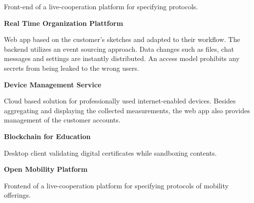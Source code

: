 \documentclass[12pt,a4paper,ragged2e,withhyper]{altacv} %
\begin{document}
\begin{paracol}{2}
\medskip
{}  

\divider

\vspace{-4pt}
Front-end of a live-cooperation platform for specifying protocols.

\medskip
{}

\medskip
{}     

\switchcolumn



\textbf{Real Time Organization Plattform}

Web app based on the customer's sketches and adapted to their workflow.
The backend utilizes an event sourcing approach.
Data changes such as files, chat messages and settings are instantly distributed.
An access model prohibits any secrets from being leaked to the wrong users.

\medskip

\textbf{Device Management Service}

Cloud based solution for professionally used internet-enabled devices.
Besides aggregating and displaying the collected measurements,
the web app also provides management of the customer accounts.

\divider


\textbf{Blockchain for Education}

Desktop client validating digital certificates while sandboxing contents.

\smallskip


\medskip

\textbf{Open Mobility Platform}

Frontend of a live-cooperation platform for specifying protocols of mobility offerings.

\smallskip

 

\smallskip



\end{paracol}
\end{document}
